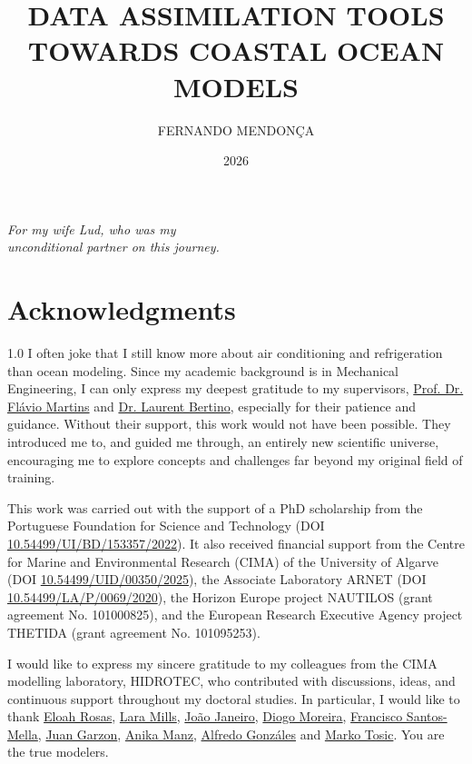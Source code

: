 \documentclass{auxfiles/ualgphdcls}
\title{DATA ASSIMILATION TOOLS TOWARDS COASTAL OCEAN MODELS}
\author{FERNANDO MENDONÇA}
\date{2026}
\begin{document}
\pagestyle{empty}
\maketitle

\vspace*{\fill}
\begin{flushright}
\textit{For my wife Lud, who was my\\unconditional partner on this journey.}
\end{flushright}
\vspace*{\fill}
\newpage

\chapter*{Acknowledgments}
\begin{spacing}{1.0}
\thispagestyle{empty}
I often joke that I still know more about air conditioning and refrigeration than ocean modeling. Since my academic background is in Mechanical Engineering, I can only express my deepest gratitude to my supervisors, \href{https://orcid.org/0000-0002-9863-6255}{Prof. Dr. Flávio Martins} and \href{https://orcid.org/0000-0002-1220-7207}{Dr. Laurent Bertino}, especially for their patience and guidance. Without their support, this work would not have been possible. They introduced me to, and guided me through, an entirely new scientific universe, encouraging me to explore concepts and challenges far beyond my original field of training.

This work was carried out with the support of a PhD scholarship from the Portuguese Foundation for Science and Technology (DOI \href{https://doi.org/10.54499/UI/BD/153357/2022}{10.54499/UI/BD/153357/2022}). It also received financial support from the Centre for Marine and Environmental Research (CIMA) of the University of Algarve (DOI \href{https://doi.org/10.54499/UID/00350/2025}{10.54499/UID/00350/2025}), the Associate Laboratory ARNET (DOI \href{https://doi.org/10.54499/LA/P/0069/2020}{10.54499/LA/P/0069/2020}), the Horizon Europe project NAUTILOS (grant agreement No. 101000825), and the European Research Executive Agency project THETIDA (grant agreement No. 101095253).

I would like to express my sincere gratitude to my colleagues from the CIMA modelling laboratory, HIDROTEC, who contributed with discussions, ideas, and continuous support throughout my doctoral studies. In particular, I would like to thank \href{https://orcid.org/0000-0002-3469-6232}{Eloah Rosas}, \href{https://orcid.org/0000-0002-0730-9700}{Lara Mills}, \href{https://orcid.org/0000-0002-6241-8520}{João Janeiro}, \href{https://orcid.org/0000-0001-5538-015X}{Diogo Moreira}, \href{https://orcid.org/0000-0002-2892-5916}{Francisco Santos-Mella}, \href{https://orcid.org/0000-0001-7641-4144}{Juan Garzon}, \href{https://orcid.org/0009-0009-7519-3613}{Anika Manz}, \href{https://orcid.org/0000-0003-3842-1460}{Alfredo Gonzáles} and \href{https://orcid.org/0000-0002-4313-2412}{Marko Tosic}. You are the true modelers.


\end{spacing}
\end{document}
